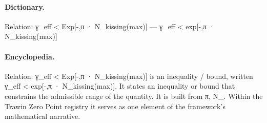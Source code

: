 \paragraph{Dictionary.}
Relation: γ\_eff < Exp[-,π · N\_kissing(max)] — γ\_eff < exp[-,π · N\_kissing(max)]

\paragraph{Encyclopedia.}
Relation: γ\_eff < Exp[-,π · N\_kissing(max)] is an inequality / bound, written γ\_eff < exp[-,π · N\_kissing(max)]. It states an inequality or bound that constrains the admissible range of the quantity. It is built from π, N\_. Within the Trawin Zero Point registry it serves as one element of the framework's mathematical narrative.
